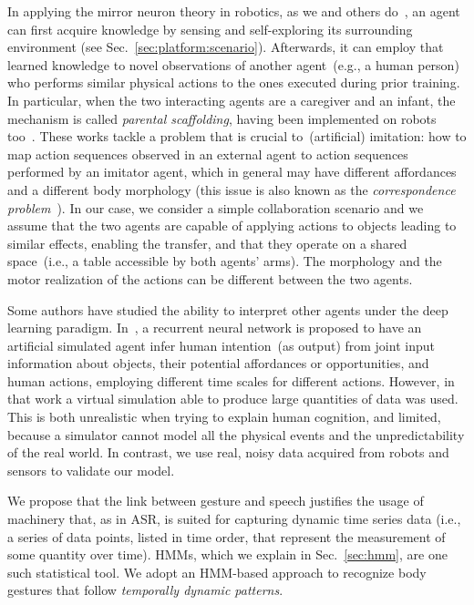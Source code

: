 In applying the mirror neuron theory in robotics, as we and others do~\cite{gazzola:2007:neuroimage,lopes:2009:ab}, an agent can first acquire knowledge by sensing and self-exploring its surrounding environment (see Sec.~\ref{sec:platform:scenario}).
Afterwards, it can employ that learned knowledge to novel observations of another agent~(e.g., a human person) who performs similar physical actions to the ones executed during prior training.
In particular, when the two interacting agents are a caregiver and an infant, the mechanism is called \emph{parental scaffolding}, having been implemented on robots too~\cite{ugur:2015:robotica,ugur:2015:tamd}.
These works tackle a problem that is crucial to~(artificial) imitation: how to map action sequences observed in an external agent to action sequences performed by an imitator agent, which in general may have different affordances and a different body morphology (this issue is also known as the \emph{correspondence problem}~\cite{nehaniv:2002:correspondence}). \label{para:correspondence_problem}
In our case, we consider a simple collaboration scenario and we assume that the two agents are capable of applying actions to objects leading to similar effects, enabling the transfer, and that they operate on a shared space~(i.e., a table accessible by both agents' arms).
The morphology and the motor realization of the actions can be different between the two agents.

Some authors have studied the ability to interpret other agents under the deep learning paradigm.
In~\cite{kim:2017:nn}, a recurrent neural network is proposed to have an artificial simulated agent infer human intention~(as output) from joint input information about objects, their potential affordances or opportunities, and human actions, employing different time scales for different actions.
However, in that work a virtual simulation able to produce large quantities of data was used.
This is both unrealistic when trying to explain human cognition, and limited, because a simulator cannot model all the physical events and the unpredictability of the real world.
In contrast, we use real, noisy data acquired from robots and sensors to validate our model.

We propose that the link between gesture and speech justifies the usage of machinery that, as in \ac{ASR},
is suited for capturing dynamic time series data (i.e., a series of data points, listed in time order, that represent the measurement of some quantity over time).
\acp{HMM}, which we explain in Sec.~\ref{sec:hmm}, are one such statistical tool.
We adopt an \acs{HMM}-based approach to recognize body gestures that follow \emph{temporally dynamic patterns}.

